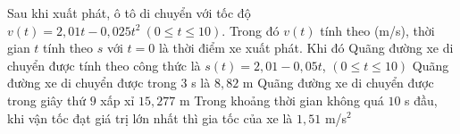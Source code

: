 \begin{ex}%
	Sau khi xuất phát, ô tô di chuyển với tốc độ $v(t)=2{,}01t-0{,}025t^2~(0\le t\le 10)$. Trong đó $v(t)$ tính theo (m/s), thời gian  $t$ tính theo $s$ với $t=0$ là thời điểm xe xuất phát. Khi đó
	\choiceTF 
		{Quãng đường xe di chuyển được tính theo công thức là $s\left( t \right)=2{,}01-0{,}05t$,  $(0\le t\le 10)$}
		{\True Quãng đường xe di chuyển được trong  $3$ s là $8{,}82$ m}
		 {\True Quãng đường xe di chuyển được trong giây thứ $9$ xấp xỉ $15{,}277$ m}
		{\True Trong khoảng thời gian không quá $10$ s đầu, khi vận tốc đạt giá trị lớn nhất thì gia tốc của xe  là $1{,}51$ m/s$^2$}
\end{ex}

